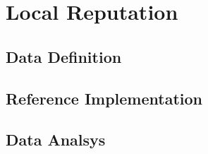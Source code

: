 \section{Local Reputation}

\subsection{Data Definition}


\subsection{Reference Implementation}


\subsection{Data Analsys}

